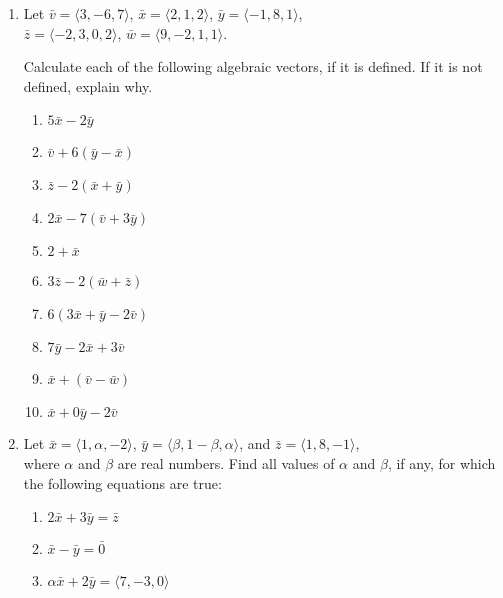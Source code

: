 
\begin{exercisebox}
\begin{enumerate}[label=\arabic*., series=exercises]

\item Let $\bar{v} = \langle 3, -6, 7 \rangle$, $\bar{x} = \langle 2, 1, 2 \rangle$, $\bar{y} = \langle -1, 8, 1 \rangle$,\\ 
$\bar{z} = \langle -2, 3, 0, 2 \rangle$, $\bar{w} = \langle 9, -2, 1, 1 \rangle$.

Calculate each of the following algebraic vectors, if it is defined. If it is not defined, explain why.

\begin{multicols}{3}
\begin{enumerate}[label=(\alph*)]
\item $5\bar{x} - 2\bar{y}$
\item $\bar{v} + 6(\bar{y} - \bar{x})$
\item $\bar{z} - 2(\bar{x} + \bar{y})$
\item $2\bar{x} - 7(\bar{v} + 3\bar{y})$
\item $2 + \bar{x}$
\item $3\bar{z} - 2(\bar{w} + \bar{z})$
\item $6(3\bar{x} + \bar{y} - 2\bar{v})$
\item $7\bar{y} - 2\bar{x} + 3\bar{v}$
\item $\bar{x} + (\bar{v} - \bar{w})$
\item $\bar{x} + 0\bar{y} - 2\bar{v}$
\end{enumerate}
\end{multicols}


\item Let $\bar{x} = \langle 1, \alpha, -2 \rangle$, $\bar{y} = \langle \beta, 1 - \beta, \alpha \rangle$, and $\bar{z} = \langle 1, 8, -1 \rangle$,\\
where $\alpha$ and $\beta$ are real numbers. Find all values of $\alpha$ and $\beta$, if any, for which the following equations are true:
\begin{multicols}{3}
\begin{enumerate}[label=(\alph*)]
\item $2\bar{x} + 3\bar{y} = \bar{z}$
\item $\bar{x} - \bar{y} = \bar{0}$
\item $\alpha \bar{x} + 2\bar{y} = \langle 7, -3, 0 \rangle$
\end{enumerate}
\end{multicols}


\end{enumerate}
\end{exercisebox}
